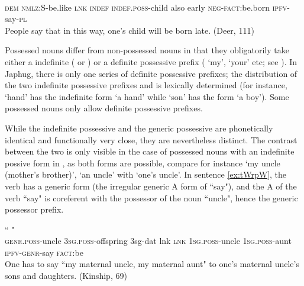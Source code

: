 \begin{exe}
\ex
\gll
{} 	 	 	 	 	 	 	 	 \\
\textsc{dem} \textsc{nmlz}:S-be.like \textsc{lnk} \textsc{indef} \textsc{indef.poss}-child also early \textsc{neg-fact}:be.born \textsc{ipfv}-say-\textsc{pl} \\
\glt People say that in this way, one's child will be born late. (Deer, 111)
\end{exe}



Possessed nouns differ from non-possessed nouns in that they obligatorily take either a indefinite  ( or )  or a definite possessive prefix ( `my',  `your' etc; see \citealt{jacques14antipassive}). In Japhug, there is only one series of definite possessive prefixes; the distribution of the two indefinite possessive prefixes  and  is lexically determined (for instance,  `hand' has the indefinite form  `a hand' while  `son' has the form  `a boy'). Some possessed nouns only allow definite possessive prefixes.

While the indefinite possessive  and the generic possessive  are phonetically identical and functionally very close, they are nevertheless distinct. The contrast between the two is only visible in the case of possessed nouns with an indefinite possive form in , as both forms are possible, compare for instance  `my uncle (mother's brother)',  `an uncle' with  `one's uncle'. In sentence \ref{ex:tWrpW}, the verb has a generic form (the irregular generic A form of  ``say"), and the A of the verb ``say" is coreferent with the possessor of the noun     ``uncle", hence the generic possessor  prefix.

\begin{exe}
\ex \label{ex:tWrpW}
\gll
  	 	 	\ipa{tɕe} 	 	`` " 	 	 \\
\textsc{genr.poss}-uncle \textsc{3sg.poss}-offspring 3sg-dat lnk \textsc{lnk} \textsc{1sg.poss}-uncle \textsc{1sg.poss}-aunt \textsc{ipfv-genr}-say \textsc{fact}:be \\
\glt One has to say ``my maternal uncle, my maternal aunt" to one's maternal uncle's sons and daughters. (Kinship, 69)
\end{exe}

